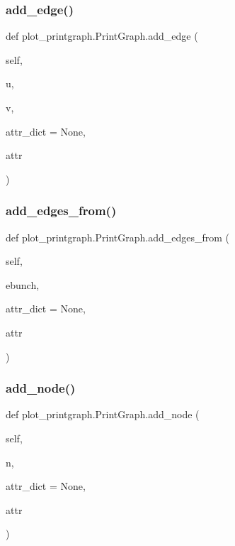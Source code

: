 \subsubsection{\texorpdfstring{add\+\_\+edge()}{add\_edge()}}
{\footnotesize\ttfamily def plot\+\_\+printgraph.\+Print\+Graph.\+add\+\_\+edge (\begin{DoxyParamCaption}\item[{}]{self,  }\item[{}]{u,  }\item[{}]{v,  }\item[{}]{attr\+\_\+dict = {\ttfamily None},  }\item[{}]{attr }\end{DoxyParamCaption})}

\mbox{\label{classplot__printgraph_1_1PrintGraph_af32c071b3b1e220adcb5eac8e5c85015}} 
\subsubsection{\texorpdfstring{add\+\_\+edges\+\_\+from()}{add\_edges\_from()}}
{\footnotesize\ttfamily def plot\+\_\+printgraph.\+Print\+Graph.\+add\+\_\+edges\+\_\+from (\begin{DoxyParamCaption}\item[{}]{self,  }\item[{}]{ebunch,  }\item[{}]{attr\+\_\+dict = {\ttfamily None},  }\item[{}]{attr }\end{DoxyParamCaption})}

\mbox{\label{classplot__printgraph_1_1PrintGraph_a78c5c15d7ad389abe03040b7dfa645a5}} 
\subsubsection{\texorpdfstring{add\+\_\+node()}{add\_node()}}
{\footnotesize\ttfamily def plot\+\_\+printgraph.\+Print\+Graph.\+add\+\_\+node (\begin{DoxyParamCaption}\item[{}]{self,  }\item[{}]{n,  }\item[{}]{attr\+\_\+dict = {\ttfamily None},  }\item[{}]{attr }\end{DoxyParamCaption})}

